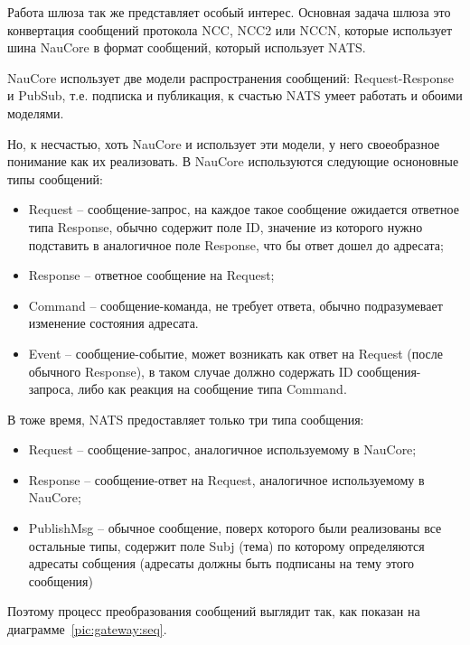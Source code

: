 Работа шлюза так же представляет особый интерес.
Основная задача шлюза это конвертация сообщений протокола NCC, NCC2 или NCCN,
которые использует шина NauCore в формат сообщений, который использует NATS\@.

NauCore использует две модели распространения сообщений: Request-Response и PubSub,
т.е. подписка и публикация, к счастью NATS умеет работать и обоими моделями.

Но, к несчастью, хоть NauCore и использует эти модели, у него своеобразное понимание как их реализовать.
В NauCore используются следующие осноновные типы сообщений:
\begin{itemize}
    \item Request -- сообщение-запрос, на каждое такое сообщение ожидается ответное типа Response,
    обычно содержит поле ID, значение из которого нужно подставить в аналогичное поле Response, что бы ответ дошел до адресата;
    \item Response -- ответное сообщение на Request;
    \item Command -- сообщение-команда, не требует ответа, обычно подразумевает изменение состояния адресата.
    \item Event -- сообщение-событие, может возникать как ответ на Request (после обычного Response),
    в таком случае должно содержать ID сообщения-запроса, либо как реакция на сообщение типа Command.
\end{itemize}

В тоже время, NATS предоставляет только три типа сообщения:
\begin{itemize}
    \item Request -- сообщение-запрос, аналогичное используемому в NauCore;
    \item Response -- сообщение-ответ на Request, аналогичное используемому в NauCore;
    \item PublishMsg -- обычное сообщение, поверх которого были реализованы все остальные типы,
    содержит поле Subj (тема) по которому определяются адресаты собщения (адресаты должны быть подписаны на тему этого сообщения)
\end{itemize}

Поэтому процесс преобразования сообщений выглядит так, как показан на диаграмме~\ref{pic:gateway:seq}.



